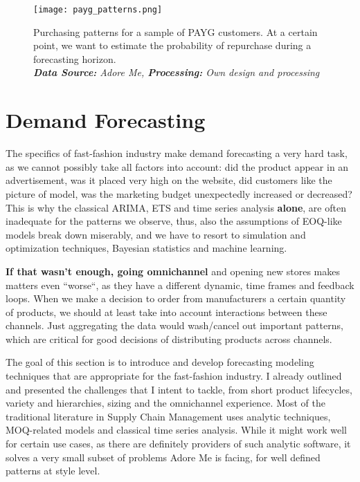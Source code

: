 \documentclass[12pt]{article}
\begin{document}
\begin{figure}[!ht]
	\centering
	\texttt{[image: payg\_patterns.png]}%
	\caption{Purchasing patterns for a sample of PAYG customers.  At a certain point, we want to estimate the probability of repurchase during a forecasting horizon.\\
		\textit{\textbf{Data Source:} Adore Me, \textbf{Processing:} Own design and processing}}
\end{figure}




\section{Demand Forecasting}

The specifics of fast-fashion industry make demand forecasting a very hard task, as we cannot possibly take all factors into account: did the product appear in an advertisement, was it placed very high on the website, did customers like the picture of model, was the marketing budget unexpectedly increased or decreased? This is why the classical ARIMA, ETS and time series analysis \textbf{alone}, are often inadequate for the patterns we observe, thus, also the assumptions of EOQ-like models break down miserably, and we have to resort to simulation and optimization techniques, Bayesian statistics and machine learning.


\textbf{If that wasn't enough, going omnichannel} and opening new stores makes matters even ``worse``, as they have a different dynamic, time frames and feedback loops. When we make a decision to order from manufacturers a certain quantity of products, we should at least take into account interactions between these channels. Just aggregating the data would wash/cancel out important patterns, which are critical for good decisions of distributing products across channels.

The goal of this section is to introduce and develop forecasting modeling techniques that are appropriate for the fast-fashion industry. I already outlined and presented the challenges that I intent to tackle, from short product lifecycles, variety and hierarchies, sizing and the omnichannel experience. Most of the traditional literature in Supply Chain Management uses analytic techniques, MOQ-related models and classical time series analysis. While it might work well for certain use cases, as there are definitely providers of such analytic software, it solves a very small subset of problems Adore Me is facing, for well defined patterns at style level.
\end{document}
